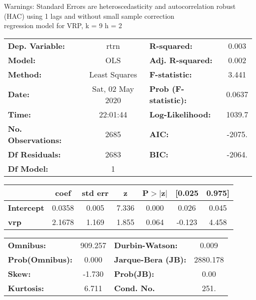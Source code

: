 Warnings: \newline
 [1] Standard Errors are heteroscedasticity and autocorrelation robust (HAC) using 1 lags and without small sample correction\\ 

regression model for VRP, k = 9 h = 2\begin{center}
\begin{tabular}{lclc}
\toprule
\textbf{Dep. Variable:}    &       rtrn       & \textbf{  R-squared:         } &     0.003   \\
\textbf{Model:}            &       OLS        & \textbf{  Adj. R-squared:    } &     0.002   \\
\textbf{Method:}           &  Least Squares   & \textbf{  F-statistic:       } &     3.441   \\
\textbf{Date:}             & Sat, 02 May 2020 & \textbf{  Prob (F-statistic):} &   0.0637    \\
\textbf{Time:}             &     22:01:44     & \textbf{  Log-Likelihood:    } &    1039.7   \\
\textbf{No. Observations:} &        2685      & \textbf{  AIC:               } &    -2075.   \\
\textbf{Df Residuals:}     &        2683      & \textbf{  BIC:               } &    -2064.   \\
\textbf{Df Model:}         &           1      & \textbf{                     } &             \\
\bottomrule
\end{tabular}
\begin{tabular}{lcccccc}
                   & \textbf{coef} & \textbf{std err} & \textbf{z} & \textbf{P$> |$z$|$} & \textbf{[0.025} & \textbf{0.975]}  \\
\midrule
\textbf{Intercept} &       0.0358  &        0.005     &     7.336  &         0.000        &        0.026    &        0.045     \\
\textbf{vrp}       &       2.1678  &        1.169     &     1.855  &         0.064        &       -0.123    &        4.458     \\
\bottomrule
\end{tabular}
\begin{tabular}{lclc}
\textbf{Omnibus:}       & 909.257 & \textbf{  Durbin-Watson:     } &    0.009  \\
\textbf{Prob(Omnibus):} &   0.000 & \textbf{  Jarque-Bera (JB):  } & 2880.178  \\
\textbf{Skew:}          &  -1.730 & \textbf{  Prob(JB):          } &     0.00  \\
\textbf{Kurtosis:}      &   6.711 & \textbf{  Cond. No.          } &     251.  \\
\bottomrule
\end{tabular}
\end{center}


